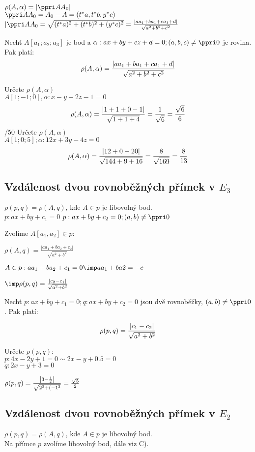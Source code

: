 $\rho(A,\alpha) = |\ve{AA_0}|$\\
$\ve{AA_0}=A_0-A = (t^*a,t^*b,y^*c)$\\
$|\ve{AA_0} = \sqrt{(t^*a)^2+(t^*b)^2+(y^*c)^2} = \f{|aa_1+ba_1+ca_1+d|}{\sqrt{a^2+b^2+c^2}}$

\V Nechť $A[a_1;a_2;a_3]$ je bod a $\alpha:ax+by+cz+d=0;(a,b,c)\ne\ve 0$ je rovina. Pak platí:
$$
\rho(A,\alpha) = \frac{|aa_1+ba_1+ca_1+d|}{\sqrt{a^2+b^2+c^2}}
$$

\Pr Určete $\rho(A,\alpha)$\\
$A[1;-1;0],\alpha : x-y+2z -1 = 0$
$$ 
\rho(A,\alpha) = \frac{|1+1+0-1|}{\sqrt{1+1+4}} = \frac1{\sqrt 6}=\frac{\sqrt 6}6
$$
/50
Určete $\rho(A,\alpha)$\\
$A[1;0;5];\alpha:12x+3y-4z = 0$
$$
\rho(A,\alpha)= \frac{|12+0-20|}{\sqrt{144+9+16}} = \frac{8}{\sqrt{169}}=\frac8{13}
$$

\subsection{Vzdálenost dvou rovnoběžných přímek v $E_3$}
\Poz $\rho(p,q) = \rho(A,q)$, kde $A\in p$ je libovolný bod.\\
$p:ax+by+c_1 = 0$
$p:ax+by+c_2 = 0; (a,b)\neq \ve 0$

Zvolíme $A[a_1,a_2]\in p$:

$\rho(A,q) = \frac{|aa_1+ba_2+c_2|}{\sqrt{a^2+b^2}}$

$A\in p : aa_1+ba_2+c_1 = 0 \imp aa_1+ba2 = -c$

\underline{$\imp \rho(p,q) = \f{|c_2-c_1|}{\sqrt{a^2+b^2}}$}

\V Nechť $p:ax+by+c_1 = 0; q: ax+by+c_2 = 0$ jsou dvě rovnoběžky, $(a,b) \neq \ve 0$. Pak platí:

$$ \rho(p,q) = \frac{|c_1-c_2|}{\sqrt{a^2+b^2}} $$

\Pr Určete $\rho(p,q)$:\\
$p: 4x-2y+1 = 0 \sim 2x-y+0.5=0$\\
$q: 2x-y+3=0$

$\rho(p,q) = \frac{\left|3-\frac12\right|}{\sqrt{2^2+(-1^2}} = \frac{\sqrt 5}2$
 

\subsection{Vzdálenost dvou rovnoběžných přímek v $E_2$}
\Poz $\rho(p,q) = \rho(A,q)$, kde $A\in p$ je libovolný bod.\\

Na přímce $p$ zvolíme libovolný bod, dále viz C).

